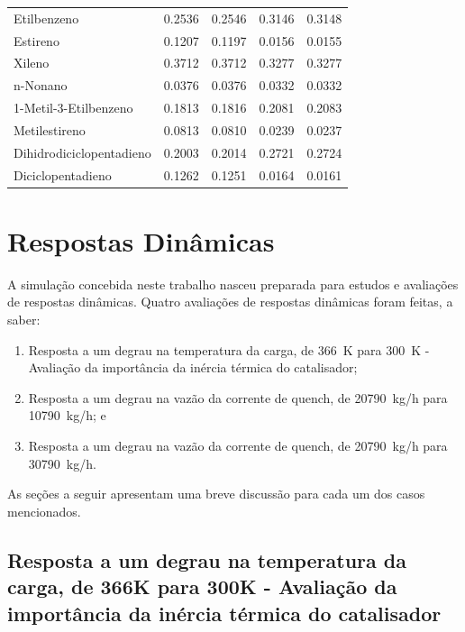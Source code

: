 \begin{table}[!htb]
\begin{center}
\begin{tabular}{lcccc}
{Etilbenzeno} & \num{0,2536} & \num{0,2546} & \num{0,3146} & \num{0,3148} \\
{Estireno} & \num{0,1207} & \num{0,1197} & \num{0,0156} & \num{0,0155} \\
{Xileno} & \num{0,3712} & \num{0,3712} & \num{0,3277} & \num{0,3277} \\
{n-Nonano} & \num{0,0376} & \num{0,0376} & \num{0,0332} & \num{0,0332} \\
{1-Metil-3-Etilbenzeno} & \num{0,1813} & \num{0,1816} & \num{0,2081} &
\num{0,2083}
\\
{Metilestireno} & \num{0,0813} & \num{0,0810} & \num{0,0239} & \num{0,0237} \\
{Dihidrodiciclopentadieno} & \num{0,2003} & \num{0,2014} & \num{0,2721} &
\num{0,2724} \\
{Diciclopentadieno} & \num{0,1262} & \num{0,1251} & \num{0,0164} & \num{0,0161}
\\
\bottomrule
\end{tabular}
\end{center}
\end{table}

\section{Respostas Dinâmicas} \label{sec:respostasdinamicas}

A simulação concebida neste trabalho nasceu preparada para estudos e avaliações
de respostas dinâmicas. Quatro avaliações de respostas dinâmicas foram feitas, a
saber:

\begin{enumerate}
  \item Resposta a   um degrau na temperatura da carga, de \SI{366}{K} para
  \SI{300}{K} - Avaliação da importância da inércia térmica do catalisador;
  \item Resposta a um degrau na vazão da corrente de quench, de \SI{20790}{kg/h}
  para \SI{10790}{kg/h}; e
  \item Resposta a um degrau na vazão da corrente de quench, de \SI{20790}{kg/h}
  para \SI{30790}{kg/h}.
\end{enumerate}

As seções a seguir apresentam uma breve discussão para cada um dos casos
mencionados.

\subsection{Resposta a   um degrau na temperatura da carga, de \si{366}{K} para
\si{300}{K} - Avaliação da importância da inércia térmica do catalisador}
\label{sec:respostaaumdegrautemp}

